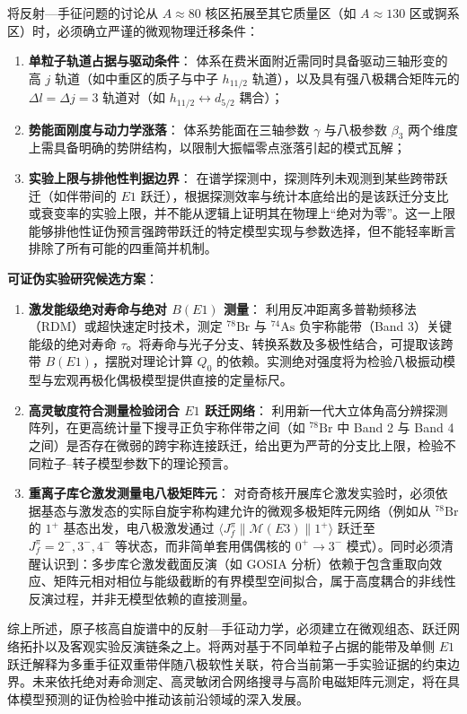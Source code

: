将反射---手征问题的讨论从 $A \approx 80$ 核区拓展至其它质量区（如 $A \approx 130$ 区或锕系区）时，必须确立严谨的微观物理迁移条件：
\begin{enumerate}
\item \textbf{单粒子轨道占据与驱动条件}：
体系在费米面附近需同时具备驱动三轴形变的高 $j$ 轨道（如中重区的质子与中子 $h_{11/2}$ 轨道），以及具有强八极耦合矩阵元的 $\Delta l = \Delta j = 3$ 轨道对（如 $h_{11/2} \leftrightarrow d_{5/2}$ 耦合）；
\item \textbf{势能面刚度与动力学涨落}：
体系势能面在三轴参数 $\gamma$ 与八极参数 $\beta_3$ 两个维度上需具备明确的势阱结构，以限制大振幅零点涨落引起的模式瓦解；
\item \textbf{实验上限与排他性判据边界}：
在谱学探测中，探测阵列未观测到某些跨带跃迁（如伴带间的 $E1$ 跃迁），根据探测效率与统计本底给出的是该跃迁分支比或衰变率的实验上限，并不能从逻辑上证明其在物理上“绝对为零”。这一上限能够排他性证伪预言强跨带跃迁的特定模型实现与参数选择，但不能轻率断言排除了所有可能的四重简并机制。
\end{enumerate}

\textbf{可证伪实验研究候选方案}：
\begin{enumerate}
\item \textbf{激发能级绝对寿命与绝对 $B(E1)$ 测量}：
利用反冲距离多普勒频移法（RDM）或超快速定时技术，测定 $^{78}\mathrm{Br}$ 与 $^{74}\mathrm{As}$ 负宇称能带（Band 3）关键能级的绝对寿命 $\tau$。将寿命与光子分支、转换系数及多极性结合，可提取该跨带 $B(E1)$，摆脱对理论计算 $Q_0$ 的依赖。实测绝对强度将为检验八极振动模型与宏观再极化偶极模型提供直接的定量标尺。
\item \textbf{高灵敏度符合测量检验闭合 $E1$ 跃迁网络}：
利用新一代大立体角高分辨探测阵列，在更高统计量下搜寻正负宇称伴带之间（如 $^{78}\mathrm{Br}$ 中 Band 2 与 Band 4 之间）是否存在微弱的跨宇称连接跃迁，给出更为严苛的分支比上限，检验不同粒子--转子模型参数下的理论预言。
\item \textbf{重离子库仑激发测量电八极矩阵元}：
对奇奇核开展库仑激发实验时，必须依据基态与激发态的实际自旋宇称构建允许的微观多极矩阵元网络（例如从 $^{78}\mathrm{Br}$ 的 $1^+$ 基态出发，电八极激发通过 $\langle J_f^\pi \| \mathcal{M}(E3) \| 1^+ \rangle$ 跃迁至 $J_f^\pi = 2^-, 3^-, 4^-$ 等状态，而非简单套用偶偶核的 $0^+ \to 3^-$ 模式）。同时必须清醒认识到：多步库仑激发截面反演（如 GOSIA 分析）依赖于包含重取向效应、矩阵元相对相位与能级截断的有界模型空间拟合，属于高度耦合的非线性反演过程，并非无模型依赖的直接测量。
\end{enumerate}

综上所述，原子核高自旋谱中的反射---手征动力学，必须建立在微观组态、跃迁网络拓扑以及客观实验反演链条之上。将两对基于不同单粒子占据的能带及单侧 $E1$ 跃迁解释为多重手征双重带伴随八极软性关联，符合当前第一手实验证据的约束边界。未来依托绝对寿命测定、高灵敏闭合网络搜寻与高阶电磁矩阵元测定，将在具体模型预测的证伪检验中推动该前沿领域的深入发展。
